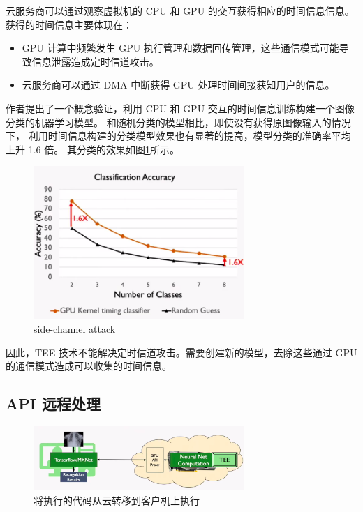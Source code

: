 \documentclass{ctexart}
\begin{document}
云服务商可以通过观察虚拟机的 CPU 和 GPU 的交互获得相应的时间信息信息。
获得的时间信息主要体现在：

\begin{itemize}
    \item GPU 计算中频繁发生 GPU 执行管理和数据回传管理，这些通信模式可能导致信息泄露造成定时信道攻击。
    \item 云服务商可以通过 DMA 中断获得 GPU 处理时间间接获知用户的信息。
\end{itemize}

作者提出了一个概念验证，利用 CPU 和 GPU 交互的时间信息训练构建一个图像分类的机器学习模型。
和随机分类的模型相比，即使没有获得原图像输入的情况下，
利用时间信息构建的分类模型效果也有显著的提高，模型分类的准确率平均上升 1.6 倍。
其分类的效果如图\ref{fig: side-chan attack}所示。

\begin{figure}
    \centering
    \includegraphics[width=8cm]{images/side-chan-attack.png}
    \caption{side-channel attack}
    \label{fig: side-chan attack}
\end{figure}

因此，TEE 技术不能解决定时信道攻击。需要创建新的模型，去除这些通过 GPU 的通信模式造成可以收集的时间信息。

\subsection{API 远程处理}

\begin{figure}
    \centering
    \includegraphics[width=8cm]{images/telekine-model.png}
    \caption{将执行的代码从云转移到客户机上执行}
    \label{fig: telekine-model}
\end{figure}
\end{document}
